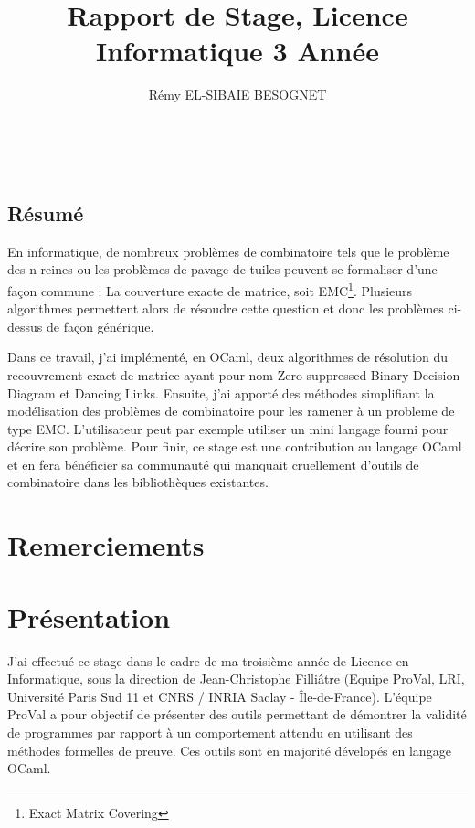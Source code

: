 \documentclass[a4paper]{article}
\title{Rapport de Stage, Licence Informatique 3\up{ème} Année}
\author{Rémy \textsc{EL-SIBAIE BESOGNET}}
\begin{document}


~
\vfill

\begin{center}
\section*{Résumé}
\end{center}
En informatique, de nombreux problèmes de combinatoire tels que le problème des 
n-reines ou les problèmes de pavage de tuiles peuvent se formaliser d'une
façon commune :
La couverture exacte de matrice, soit EMC\footnote{Exact Matrix Covering}. 
Plusieurs algorithmes permettent alors 
de résoudre cette question et donc les problèmes ci-dessus de façon générique.

Dans ce travail, j'ai implémenté, en OCaml, deux algorithmes de
résolution du recouvrement exact de matrice ayant pour nom 
Zero-suppressed Binary Decision
Diagram et Dancing Links. 
Ensuite, j'ai apporté des méthodes 
simplifiant la modélisation des problèmes de combinatoire pour les ramener
à un probleme de type EMC. L'utilisateur peut par 
exemple utiliser un mini langage fourni pour décrire son problème. Pour finir, 
ce stage est une contribution au langage OCaml et 
en fera bénéficier sa communauté qui manquait cruellement d'outils de 
combinatoire dans les bibliothèques existantes.

\vfill




\newpage
\section*{Remerciements}

\newpage
\tableofcontents
\newpage
\listoffigures

\newpage
\section{Présentation}


J'ai effectué ce stage dans le cadre de ma troisième année de Licence en 
Informatique, sous la direction de Jean-Christophe Filliâtre (Equipe ProVal, 
LRI, Université Paris Sud 11 et CNRS / INRIA Saclay - Île-de-France). L'équipe 
ProVal a pour objectif de présenter des outils permettant de démontrer la 
validité de programmes par rapport à un comportement attendu en utilisant des
méthodes formelles de preuve.
Ces outils sont en majorité dévelopés en langage OCaml. 
\end{document}
